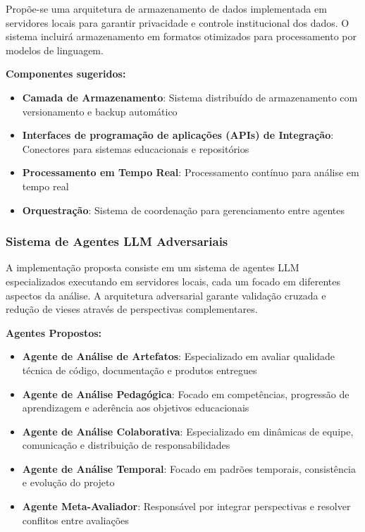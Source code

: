 \documentclass[english, spanish, brazilian]{modelo_dt}
\begin{document}
Propõe-se uma arquitetura de armazenamento de dados implementada em servidores locais para garantir privacidade e controle institucional dos dados. O sistema incluirá armazenamento em formatos otimizados para processamento por modelos de linguagem.

\textbf{Componentes sugeridos:}
\begin{itemize}
\item \textbf{Camada de Armazenamento}: Sistema distribuído de armazenamento com versionamento e backup automático
\item \textbf{Interfaces de programação de aplicações (APIs) de Integração}: Conectores para sistemas educacionais e repositórios
\item \textbf{Processamento em Tempo Real}: Processamento contínuo para análise em tempo real
\item \textbf{Orquestração}: Sistema de coordenação para gerenciamento entre agentes
\end{itemize}

\subsubsection{Sistema de Agentes LLM Adversariais}

A implementação proposta consiste em um sistema de agentes LLM especializados executando em servidores locais, cada um focado em diferentes aspectos da análise. A arquitetura adversarial garante validação cruzada e redução de vieses através de perspectivas complementares.

\textbf{Agentes Propostos:}

\begin{itemize}
\item \textbf{Agente de Análise de Artefatos}: Especializado em avaliar qualidade técnica de código, documentação e produtos entregues
\item \textbf{Agente de Análise Pedagógica}: Focado em competências, progressão de aprendizagem e aderência aos objetivos educacionais
\item \textbf{Agente de Análise Colaborativa}: Especializado em dinâmicas de equipe, comunicação e distribuição de responsabilidades
\item \textbf{Agente de Análise Temporal}: Focado em padrões temporais, consistência e evolução do projeto
\item \textbf{Agente Meta-Avaliador}: Responsável por integrar perspectivas e resolver conflitos entre avaliações
\end{itemize}
\end{document}
